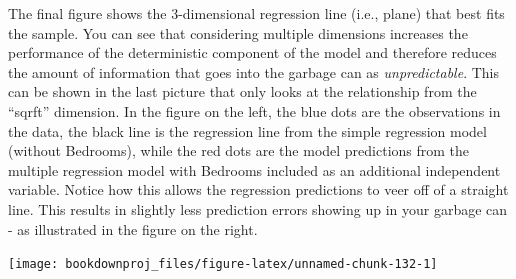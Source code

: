 \documentclass[
]{book}
\newenvironment{Shaded}{\begin{snugshade}}{\end{snugshade}}
\newcommand{\AttributeTok}[1]{\textcolor[rgb]{0.77,0.63,0.00}{#1}}
\newcommand{\DecValTok}[1]{\textcolor[rgb]{0.00,0.00,0.81}{#1}}
\newcommand{\FunctionTok}[1]{\textcolor[rgb]{0.00,0.00,0.00}{#1}}
\newcommand{\NormalTok}[1]{#1}
\newcommand{\SpecialCharTok}[1]{\textcolor[rgb]{0.00,0.00,0.00}{#1}}
\newcommand{\StringTok}[1]{\textcolor[rgb]{0.31,0.60,0.02}{#1}}
\begin{document}
The final figure shows the 3-dimensional regression line (i.e., plane) that best fits the sample. You can see that considering multiple dimensions increases the performance of the deterministic component of the model and therefore reduces the amount of information that goes into the garbage can as \emph{unpredictable}. This can be shown in the last picture that only looks at the relationship from the ``sqrft'' dimension. In the figure on the left, the blue dots are the observations in the data, the black line is the regression line from the simple regression model (without Bedrooms), while the red dots are the model predictions from the multiple regression model with Bedrooms included as an additional independent variable. Notice how this allows the regression predictions to veer off of a straight line. This results in slightly less prediction errors showing up in your garbage can - as illustrated in the figure on the right.

\begin{center}\texttt{[image: bookdownproj\_files/figure-latex/unnamed-chunk-132-1]} \end{center}

\begin{Shaded}
\end{Shaded}
\end{document}

